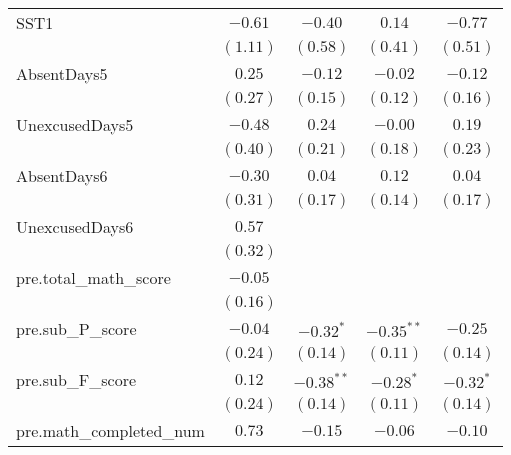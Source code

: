 \begin{center}
\begin{longtable}{l c c c c}
SST1                                               & $-0.61$      & $-0.40$      & $0.14$       & $-0.77$      \\
                                                   & $(1.11)$     & $(0.58)$     & $(0.41)$     & $(0.51)$     \\
AbsentDays5                                        & $0.25$       & $-0.12$      & $-0.02$      & $-0.12$      \\
                                                   & $(0.27)$     & $(0.15)$     & $(0.12)$     & $(0.16)$     \\
UnexcusedDays5                                     & $-0.48$      & $0.24$       & $-0.00$      & $0.19$       \\
                                                   & $(0.40)$     & $(0.21)$     & $(0.18)$     & $(0.23)$     \\
AbsentDays6                                        & $-0.30$      & $0.04$       & $0.12$       & $0.04$       \\
                                                   & $(0.31)$     & $(0.17)$     & $(0.14)$     & $(0.17)$     \\
UnexcusedDays6                                     & $0.57$       &              &              &              \\
                                                   & $(0.32)$     &              &              &              \\
pre.total\_math\_score                             & $-0.05$      &              &              &              \\
                                                   & $(0.16)$     &              &              &              \\
pre.sub\_P\_score                                  & $-0.04$      & $-0.32^{*}$  & $-0.35^{**}$ & $-0.25$      \\
                                                   & $(0.24)$     & $(0.14)$     & $(0.11)$     & $(0.14)$     \\
pre.sub\_F\_score                                  & $0.12$       & $-0.38^{**}$ & $-0.28^{*}$  & $-0.32^{*}$  \\
                                                   & $(0.24)$     & $(0.14)$     & $(0.11)$     & $(0.14)$     \\
pre.math\_completed\_num                           & $0.73$       & $-0.15$      & $-0.06$      & $-0.10$      \\

\end{longtable}
\end{center}
